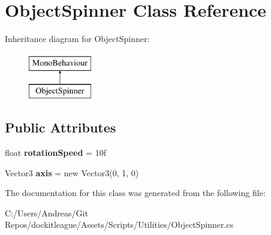 \hypertarget{class_object_spinner}{}\section{Object\+Spinner Class Reference}
\label{class_object_spinner}
Inheritance diagram for Object\+Spinner\+:\begin{figure}[H]
\begin{center}
\leavevmode
\includegraphics[height=2.000000cm]{class_object_spinner}
\end{center}
\end{figure}
\subsection*{Public Attributes}
\begin{DoxyCompactItemize}
\item 
\hypertarget{class_object_spinner_a20e739393f74bc4834895e33158c2817}{}\label{class_object_spinner_a20e739393f74bc4834895e33158c2817} 
float {\bfseries rotation\+Speed} = 10f
\item 
\hypertarget{class_object_spinner_a361f723213af50286b7086134c0693f3}{}\label{class_object_spinner_a361f723213af50286b7086134c0693f3} 
Vector3 {\bfseries axis} = new Vector3(0, 1, 0)
\end{DoxyCompactItemize}


The documentation for this class was generated from the following file\+:\begin{DoxyCompactItemize}
\item 
C\+:/\+Users/\+Andreas/\+Git Repos/dockitleague/\+Assets/\+Scripts/\+Utilities/Object\+Spinner.\+cs\end{DoxyCompactItemize}

